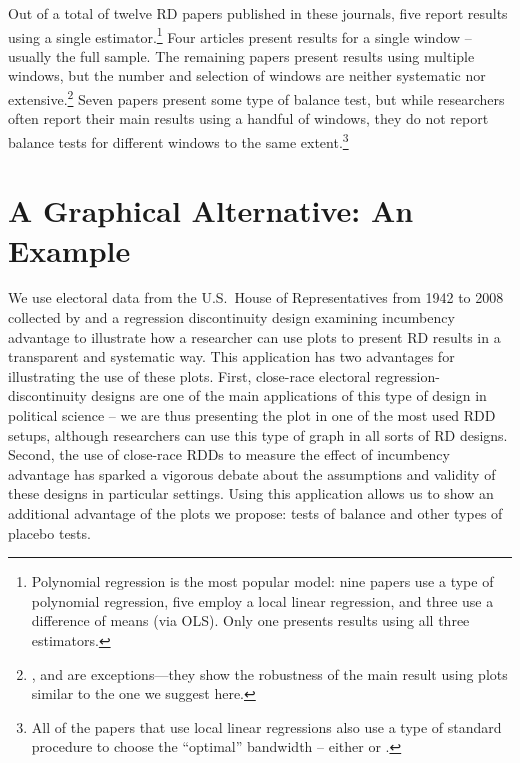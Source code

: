 \documentclass[letterpaper,twoside,12pt]{article}\usepackage[]{graphicx}\usepackage[]{color}
\begin{document}
Out of a total of twelve RD papers published in these journals, five report results using a single estimator.\footnote{Polynomial regression is the most popular model: nine papers use a type of polynomial regression, five employ a local linear regression, and three use a difference of means (via OLS). Only one presents results using all three estimators.} Four articles present results for a single window -- usually the full sample. The remaining papers present results using multiple windows, but the number and selection of windows are neither systematic nor extensive.\footnote{\citet{gerber2011mayors}, \citet{ferwerda2014devolution} and \citet{eggers2015} are exceptions---they show the robustness of the main result using plots similar to the one we suggest here.} Seven papers present some type of balance test, but while researchers often report their main results using a handful of windows, they do not report balance tests for different windows to the same extent.\footnote{All of the papers that use local linear regressions also use a type of standard procedure to choose the ``optimal'' bandwidth -- either \citet{imbens2008regression} or \citet{imbens2011optimal}.}

\section*{A Graphical Alternative: An Example}

We use electoral data from the U.S.\ House of Representatives from 1942 to 2008 collected by \citet{caughey2011elections} and a regression discontinuity design examining incumbency advantage to illustrate how a researcher can use plots to present RD results in a transparent and systematic way. This application has two advantages for illustrating the use of these plots. First, close-race electoral regression-discontinuity designs are one of the main applications of this type of design in political science -- we are thus presenting the plot in one of the most used RDD setups, although researchers can use this type of graph in all sorts of RD designs. Second, the use of close-race RDDs to measure the effect of incumbency advantage has sparked a vigorous debate about the assumptions and validity of these designs in particular settings. Using this application allows us to show an additional advantage of the plots we propose: tests of balance and other types of placebo tests.
\end{document}
